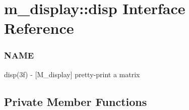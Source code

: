 \hypertarget{interfacem__display_1_1disp}{}\section{m\+\_\+display\+:\+:disp Interface Reference}
\label{interfacem__display_1_1disp}


\subsubsection*{N\+A\+ME}

disp(3f) -\/ \mbox{[}M\+\_\+display\mbox{]} pretty-\/print a matrix  


\subsection*{Private Member Functions}
